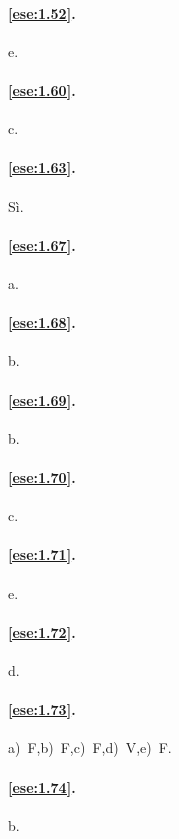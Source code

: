 \paragraph{\ref{ese:1.52}.}
e.

\paragraph{\ref{ese:1.60}.}
c.

\paragraph{\ref{ese:1.63}.}
Sì.

\paragraph{\ref{ese:1.67}.}
a.

\paragraph{\ref{ese:1.68}.}
b.

\paragraph{\ref{ese:1.69}.}
b.

\paragraph{\ref{ese:1.70}.}
c.

\paragraph{\ref{ese:1.71}.}
e.

\paragraph{\ref{ese:1.72}.}
d.

\paragraph{\ref{ese:1.73}.}
a)~F,\quad b)~F,\quad c)~F,\quad d)~V,\quad e)~F.

\paragraph{\ref{ese:1.74}.}
b.

